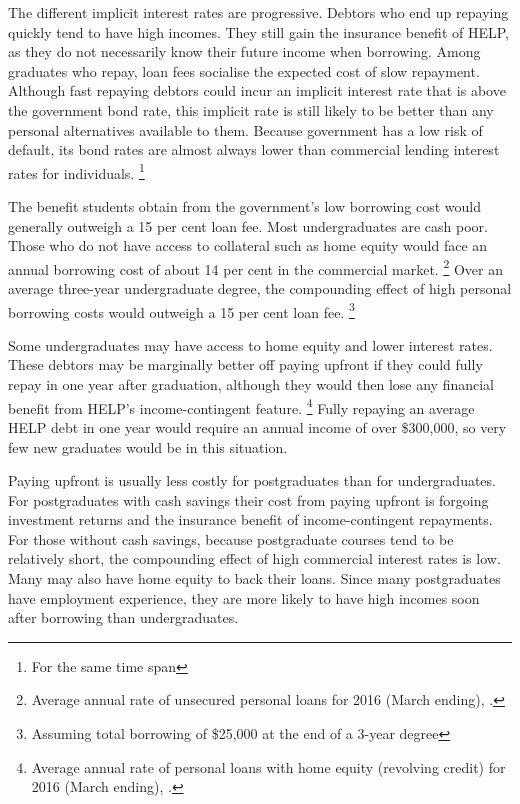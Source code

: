 \documentclass[embargoed]{grattan}
\begin{document}
The different implicit interest rates are progressive.
Debtors who end up repaying quickly tend to have high incomes.
They still gain the insurance benefit of \gls{HELP}, as they do not necessarily know their future income when borrowing.
Among graduates who repay, loan fees socialise the expected cost of slow repayment.
Although fast repaying debtors could incur an implicit interest rate that is above the government bond rate, this implicit rate is still likely to be better than any personal alternatives available to them.
Because government has a low risk of default, its bond rates are almost always lower than commercial lending interest rates for individuals.%
\footnote{For the same time span}

The benefit students obtain from the government's low borrowing cost would generally outweigh a 15 per cent loan fee.
Most undergraduates are cash poor.
Those who do not have access to collateral such as home equity would face an annual borrowing cost of about 14 per cent in the commercial market.%
\footnote{Average annual rate of unsecured personal loans for 2016 (March ending), \textcite{RBA2016F5Indicatorlending}.} Over an average three-year undergraduate degree, the compounding effect of high personal borrowing costs would outweigh a 15 per cent loan fee.%
\footnote{Assuming total borrowing of \$25,000 at the end of a 3-year degree}

Some undergraduates may have access to home equity and lower interest rates.
These debtors may be marginally better off paying upfront if they could fully repay in one year after graduation, although they would then lose any financial benefit from \gls{HELP}'s income-contingent feature.%
\footnote{Average annual rate of personal loans with home equity (revolving credit) for 2016 (March ending), \textcite{RBA2016F5Indicatorlending}.} Fully repaying an average \gls{HELP} debt in one year would require an annual income of over \$300,000, so very few new graduates would be in this situation.

Paying upfront is usually less costly for postgraduates than for undergraduates.
For postgraduates with cash savings their cost from paying upfront is forgoing investment returns and the insurance benefit of income-contingent repayments.
For those without cash savings, because postgraduate courses tend to be relatively short, the compounding effect of high commercial interest rates is low.
Many may also have home equity to back their loans.
Since many postgraduates have employment experience, they are more likely to have high incomes soon after borrowing than undergraduates.
\end{document}
